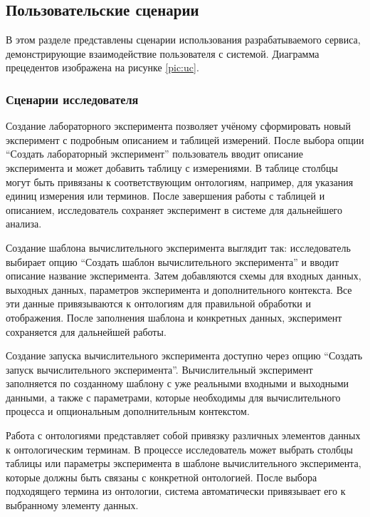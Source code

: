 \setcounter{section}{2}
\setcounter{subsection}{0}


\subsection{Пользовательские сценарии}

В этом разделе представлены сценарии использования разрабатываемого сервиса, демонстрирующие взаимодействие пользователя с системой. Диаграмма прецедентов изображена на рисунке \ref{pic:uc}.

\subsubsection{Сценарии исследователя}

Создание лабораторного эксперимента позволяет учёному сформировать новый эксперимент с подробным описанием и таблицей измерений. После выбора опции “Создать лабораторный эксперимент” пользователь вводит описание эксперимента и может добавить таблицу с измерениями. В таблице столбцы могут быть привязаны к соответствующим онтологиям, например, для указания единиц измерения или терминов. После завершения работы с таблицей и описанием, исследователь сохраняет эксперимент в системе для дальнейшего анализа.

Создание шаблона вычислительного эксперимента выглядит так: исследователь выбирает опцию “Создать шаблон вычислительного эксперимента” и вводит описание название эксперимента. Затем добавляются схемы для входных данных, выходных данных, параметров эксперимента и дополнительного контекста. Все эти данные привязываются к онтологиям для правильной обработки и отображения. После заполнения шаблона и конкретных данных, эксперимент сохраняется для дальнейшей работы.

Создание запуска вычислительного эксперимента доступно через опцию “Создать запуск вычислительного эксперимента”. Вычислительный эксперимент заполняется по созданному шаблону с уже реальными входными и выходными данными, а также с параметрами, которые необходимы для вычислительного процесса и опциональным дополнительным контекстом.

Работа с онтологиями представляет собой привязку различных элементов данных к онтологическим терминам. В процессе исследователь может выбрать столбцы таблицы или параметры эксперимента в шаблоне вычислительного эксперимента, которые должны быть связаны с конкретной онтологией. После выбора подходящего термина из онтологии, система автоматически привязывает его к выбранному элементу данных.

